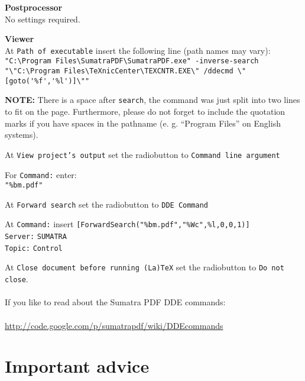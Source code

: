 \documentclass[parskip=half-]{scrartcl}
\begin{document}
\textbf{Postprocessor}\\
No settings required.

\textbf{Viewer}\\
At \texttt{Path of executable} insert the following line (path names may vary):\\
\verb+"C:\Program Files\SumatraPDF\SumatraPDF.exe" -inverse-search+\\ \verb+"\"C:\Program Files\TeXnicCenter\TEXCNTR.EXE\" /ddecmd \"[goto('%f','%l')]\""+

\textbf{NOTE:} There is a space after \texttt{search}, the command was just split into two lines to fit on the page. Furthermore, please do not forget to include the quotation marks if you have spaces in the pathname (e. g. ``Program Files'' on English systems).

At \texttt{View project's output} set the radiobutton to \texttt{Command line argument}

For \texttt{Command:} enter:\\
\verb+"%bm.pdf"+

At \texttt{Forward search} set the radiobutton to \texttt{DDE Command} 

At \texttt{Command:} insert\newline
\verb|[ForwardSearch("%bm.pdf","%Wc",%l,0,0,1)]|\\
\texttt{Server:} \texttt{SUMATRA}\\
\texttt{Topic:} \texttt{Control}

At \texttt{Close document before running (La)TeX} set the radiobutton to \texttt{Do not close}.\\
\\
If you like to read about the Sumatra PDF DDE commands:\\
\\
\url{http://code.google.com/p/sumatrapdf/wiki/DDEcommands}

\section{Important advice}
\end{document}
